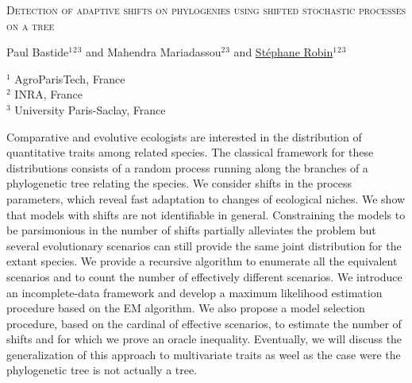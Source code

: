\documentclass[a4paper,english]{article}
\def\title#1{{\Large\bf  \begin{center} \textsc{#1} \vspace{0pt} \end{center}  } }
\def\authors#1{{\large \begin{center} #1 \vspace{0pt} \end{center} } }
\def\university#1{{ \begin{center} #1 \vspace{0pt} \end{center} } }
\def\inst#1{\unskip$^{#1}$}
\begin{document}
\title{
Detection of adaptive shifts on phylogenies using shifted stochastic processes on a tree
}

\authors{
Paul Bastide\inst{1}\inst{2}\inst{3} and Mahendra Mariadassou\inst{2}\inst{3} and \underline{St\'ephane Robin}\inst{1}\inst{2}\inst{3} 
% 
% 
}

 \university{
 \inst{1} AgroParisTech, France\\
 \inst{2} INRA, France\\
 \inst{3} University Paris-Saclay, France\\
 }

Comparative and evolutive ecologists are interested in the distribution of quantitative traits among related species. The classical framework for these distributions consists of a random process running along the branches of a phylogenetic tree relating the species. We consider shifts in the process parameters, which reveal fast adaptation to changes of ecological niches. We show that models with shifts are not identifiable in general. Constraining the models to be parsimonious in the number of shifts partially alleviates the problem but several evolutionary scenarios can still provide the same joint distribution for the extant species. We provide a recursive algorithm to enumerate all the equivalent scenarios and to count the number of effectively different scenarios. We introduce an incomplete-data framework and develop a maximum likelihood estimation procedure based on the EM algorithm. We also propose a model selection procedure, based on the cardinal of effective scenarios, to estimate the number of shifts and for which we prove an oracle inequality. Eventually, we will discuss the generalization of this approach to multivariate traits as weel as the case were the phylogenetic tree is not actually a tree.
\end{document}
